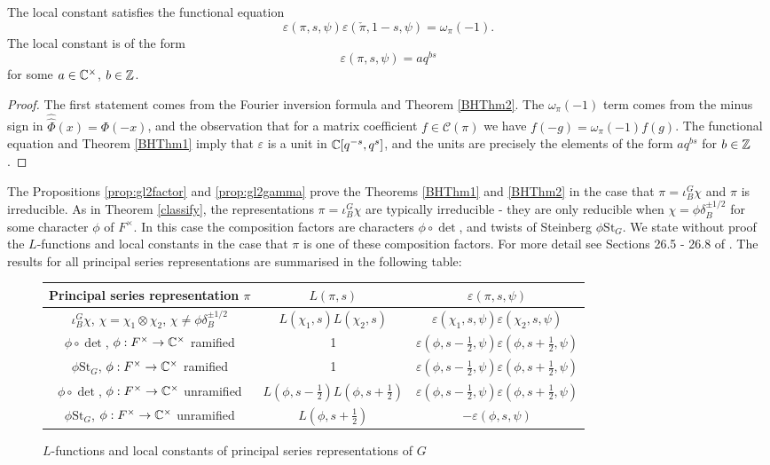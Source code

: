 \begin{cor}
    The local constant satisfies the functional equation
    $$\varepsilon(\pi,s,\psi)\varepsilon(\check{\pi},1-s,\psi) = \omega_\pi(-1).$$
    The local constant is of the form $$\varepsilon(\pi,s,\psi) = aq^{bs}$$ for some $a \in \mathbb{C}^\times$, $b \in \mathbb{Z}$. 
\end{cor}
\begin{proof}
    The first statement comes from the Fourier inversion formula and Theorem \ref{BHThm2}. The $\omega_\pi(-1)$ term comes from the minus sign in $\hat{\hat{\Phi}}(x)=\Phi(-x)$, and the observation that for a matrix coefficient $f \in \mathcal C(\pi)$ we have $f(-g)=\omega_\pi(-1)f(g)$. The functional equation and Theorem \ref{BHThm1} imply that $\varepsilon$ is a unit in $\mathbb{C}[q^{-s},q^s]$, and the units are precisely the elements of the form $aq^{bs}$ for $b \in \mathbb{Z}$.
\end{proof}

The Propositions \ref{prop:gl2factor} and \ref{prop:gl2gamma} prove the Theorems \ref{BHThm1} and \ref{BHThm2} in the case that $\pi = \iota_B^G \chi$ and $\pi$ is irreducible. As in Theorem \ref{classify}, the representations $\pi = \iota_B^G \chi$ are typically irreducible - they are only reducible when $\chi = \phi \delta_B^{\pm 1/2}$ for some character $\phi$ of $F^\times$. In this case the composition factors are characters $\phi \circ \det$, and twists of Steinberg $\phi \mathrm{St}_G$. We state without proof the $L$-functions and local constants in the case that $\pi$ is one of these composition factors. For more detail see Sections 26.5 - 26.8 of \cite{BH1}. The results for all principal series representations are summarised in the following table:

\begin{figure}[h!]
    \centering
    \begin{tabular}{ |c|c|c| }
        \hline
        Principal series representation $\pi$ & $L(\pi,s)$ & $\varepsilon(\pi,s,\psi)$ \\ \hline
        $\iota_B^G \chi$, $\chi=\chi_1\otimes \chi_2$, $\chi \neq \phi \delta_B^{\pm 1/2}$ & $L(\chi_1,s)L(\chi_2,s)$ & $\varepsilon(\chi_1,s,\psi)\varepsilon(\chi_2,s,\psi)$ \\ 
        $\phi \circ \det$, $\phi :F^\times \to \mathbb{C}^\times$ ramified & 1 & $\varepsilon(\phi,s-\frac{1}{2},\psi)\varepsilon(\phi,s+\frac{1}{2},\psi)$ \\ 
        $\phi \mathrm{St}_G$, $\phi :F^\times \to \mathbb{C}^\times$ ramified & 1 & $\varepsilon(\phi,s-\frac{1}{2},\psi)\varepsilon(\phi,s+\frac{1}{2},\psi)$ \\  
        $\phi \circ \det$, $\phi :F^\times \to \mathbb{C}^\times$ unramified & $L(\phi,s-\frac{1}{2})L(\phi,s+\frac{1}{2})$ & $\varepsilon(\phi,s-\frac{1}{2},\psi)\varepsilon(\phi,s+\frac{1}{2},\psi)$ \\ 
        $\phi \mathrm{St}_G$, $\phi :F^\times \to \mathbb{C}^\times$ unramified & $L(\phi,s+\frac{1}{2})$ & $-\varepsilon(\phi,s,\psi)$ \\     
        \hline
       \end{tabular}
       \caption{$L$-functions and local constants of principal series representations of $G$}
\end{figure}

